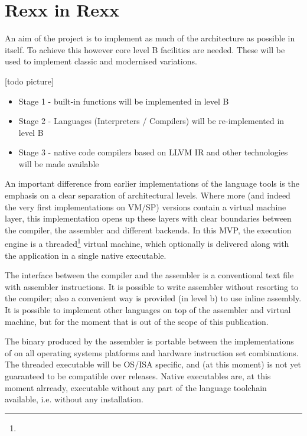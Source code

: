\section{Rexx in Rexx}
An aim of the project is to implement as much of the \crexx{} architecture as possible in \rexx{} itself. To achieve this however core \rexx{} level B facilities are needed. These will be used to implement classic \rexx{} and modernised \rexx{} variations. 

[todo picture]
\begin{itemize}
\item Stage 1 - \rexx{} built-in functions will be implemented in \crexx{} level B
\item Stage 2 - \rexx{} Languages (Interpreters / Compilers) will be re-implemented in \crexx{} level B
\item Stage 3 - native code compilers based on LLVM IR and other technologies will be made available
\end{itemize}

An important difference from earlier implementations of the language tools is the emphasis on a clear separation of architectural levels. Where more (and indeed the very first implementations on VM/SP) versions contain a virtual machine layer, this implementation opens up these layers with clear boundaries between the compiler, the assembler and different backends. In this MVP, the execution engine is a threaded\footnote{} virtual machine, which optionally is delivered along with the application in a single native executable.

The interface between the compiler and the assembler is a conventional text file with \crexx{} assembler instructions. It is possible to write \crexx{} assembler without resorting to the compiler; also a convenient way is provided (in \crexx{} level b) to use inline assembly. It is possible to implement other languages on top of the assembler and virtual machine, but for the moment that is out of the scope of this publication.

The binary produced by the assembler is portable between the implementations of \crexx{} on all operating systems platforms and hardware instruction set combinations. The threaded executable will be OS/ISA specific, and (at this moment) is not yet guaranteed to be compatible over \crexx{} releases. Native executables are, at this moment alrready, executable without any part of the language toolchain available, i.e. without any installation.

